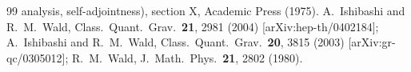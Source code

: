 \documentclass[aps,floats,showpacs,amssymb,tightenlines]{revtex4}
\begin{document}
\begin{thebibliography}{99}
  analysis, self-adjointness), section X,
  Academic Press (1975).
  A.~Ishibashi and R.~M.~Wald,
  Class.\ Quant.\ Grav.\  {\bf 21}, 2981 (2004)
  [arXiv:hep-th/0402184]; 
  A.~Ishibashi and R.~M.~Wald,
  Class.\ Quant.\ Grav.\  {\bf 20}, 3815 (2003)
  [arXiv:gr-qc/0305012]; 
  R.~M.~Wald,
  J.\ Math.\ Phys.\  {\bf 21}, 2802 (1980).




\end{thebibliography}
\end{document}
